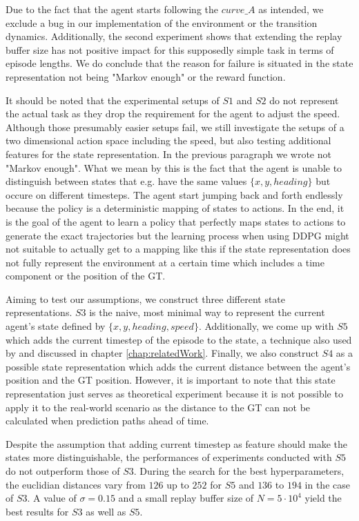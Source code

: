 Due to the fact that the agent starts following the $curve\_A$ as intended, we exclude a bug in our implementation of the environment or the transition dynamics. Additionally, the second experiment shows that extending the replay buffer size has not positive impact for this supposedly simple task in terms of episode lengths. We do conclude that the reason for failure is situated in the state representation not being "Markov enough" or the reward function.
\par
It should be noted that the experimental setups of $S1$ and $S2$ do not represent the actual task as they drop the requirement for the agent to adjust the speed. Although those presumably easier setups fail, we still investigate the setups of a two dimensional action space including the speed, but also testing additional features for the state representation. In the previous paragraph we wrote not "Markov enough". What we mean by this is the fact that the agent is unable to distinguish between states that e.g. have the same values $\{x, y, heading\}$ but occure on different timesteps. The agent start jumping back and forth endlessly because the policy is a deterministic mapping of states to actions. In the end, it is the goal of the agent to learn a policy that perfectly maps states to actions to generate the exact trajectories but the learning process when using DDPG might not suitable to actually get to a mapping like this if the state representation does not fully represent the environment at a certain time which includes a time component or the position of the GT.
\par
Aiming to test our assumptions, we construct three different state representations. $S3$ is the naive, most minimal way to represent the current agent's state defined by $\{x, y, heading, speed\}$. Additionally, we come up with $S5$ which  adds the current timestep of the episode to the state, a technique also used by \cite{liu2019vessel} and discussed in chapter \ref{chap:relatedWork}. Finally, we also construct $S4$ as a possible state representation which adds the current distance between the agent's position and the GT position. However, it is important to note that this state representation just serves as theoretical experiment because it is not possible to apply it to the real-world scenario as the distance to the GT can not be calculated when prediction paths ahead of time.
\par
Despite the assumption that adding current timestep as feature should make the states more distinguishable, the performances of experiments conducted with $S5$ do not outperform those of $S3$. During the search for the best hyperparameters, the euclidian distances vary from $126$ up to $252$ for $S5$ and $136$ to $194$ in the case of $S3$. A value of $\sigma = 0.15$ and a small replay buffer size of $N=5 \cdot 10^4$ yield the best results for $S3$ as well as $S5$. 
